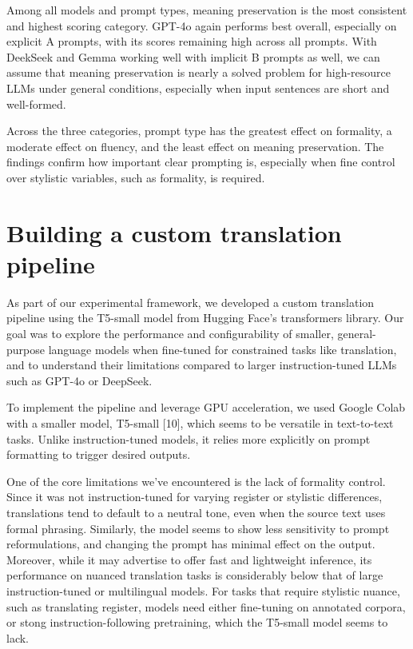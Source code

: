 \documentclass[fleqn,moreauthors,10pt]{ds_report}
\begin{document}
Among all models and prompt types, meaning preservation is the most consistent and highest scoring category. GPT-4o again performs best overall, especially on explicit A prompts, with its scores remaining high across all prompts. With DeekSeek and Gemma working well with implicit B prompts as well, we can assume that meaning preservation is nearly a solved problem for high-resource LLMs under general conditions, especially when input sentences are short and well-formed.

Across the three categories, prompt type has the greatest effect on formality, a moderate effect on fluency, and the least effect on meaning preservation. The findings confirm how important clear prompting is, especially when fine control over stylistic variables, such as formality, is required.

\section{Building a custom translation pipeline}

As part of our experimental framework, we developed a custom translation pipeline using the T5-small model from Hugging Face’s transformers library. Our goal was to explore the performance and configurability of smaller, general-purpose language models when fine-tuned for constrained tasks like translation, and to understand their limitations compared to larger instruction-tuned LLMs such as GPT-4o or DeepSeek.

To implement the pipeline and leverage GPU acceleration, we used Google Colab with a smaller model, T5-small [10], which seems to be versatile in text-to-text tasks. Unlike instruction-tuned models, it relies more explicitly on prompt formatting to trigger desired outputs.

One of the core limitations we’ve encountered is the lack of formality control. Since it was not instruction-tuned for varying register or stylistic differences, translations tend to default to a neutral tone, even when the source text uses formal phrasing. Similarly, the model seems to show less sensitivity to prompt reformulations, and changing the prompt has minimal effect on the output. Moreover, while it may advertise to offer fast and lightweight inference, its performance on nuanced translation tasks is considerably below that of large instruction-tuned or multilingual models. For tasks that require stylistic nuance, such as translating register, models need either fine-tuning on annotated corpora, or stong instruction-following pretraining, which the T5-small model seems to lack.
\end{document}
